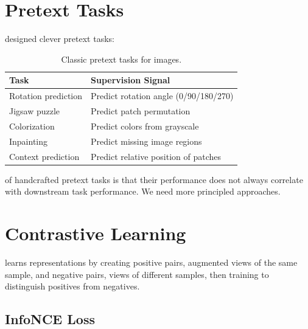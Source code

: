 
\newpage
\section{Pretext Tasks}


 designed clever pretext tasks:

\begin{table}
\centering
\begin{tabular}{ll}
\toprule
\textbf{Task} & \textbf{Supervision Signal} \\
\midrule
Rotation prediction & Predict rotation angle (0/90/180/270) \\
Jigsaw puzzle & Predict patch permutation \\
Colorization & Predict colors from grayscale \\
Inpainting & Predict missing image regions \\
Context prediction & Predict relative position of patches \\
\bottomrule
\end{tabular}
\caption{Classic pretext tasks for images.}
\label{tab:pretext_tasks}
\end{table}

 of handcrafted pretext tasks is that their performance does not always correlate with downstream task performance. We need more principled approaches.


\section{Contrastive Learning}


 learns representations by creating positive pairs, augmented views of the same sample, and negative pairs, views of different samples, then training to distinguish positives from negatives.

\subsection{InfoNCE Loss}

